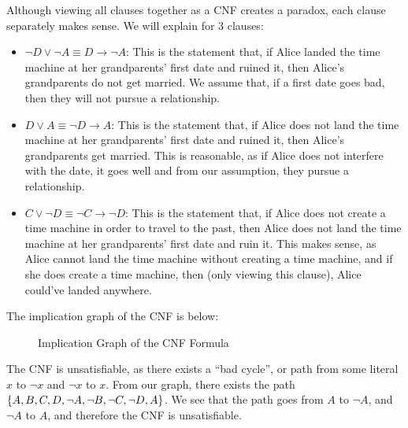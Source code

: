 \documentclass[11pt]{scrartcl}
\theoremstyle{dotlessP}
\theoremstyle{dotlessN}
\DeclarePairedDelimiter\set{\{}{\}}
\begin{document}
Although viewing all clauses together as a CNF creates a paradox, each clause separately makes sense. We will explain for 3 clauses:
\begin{itemize}
	\item $\neg D \lor \neg A \equiv D \to \neg A$: This is the statement that, if Alice landed the time machine at her grandparents' first date and ruined it, then Alice's grandparents do not get married. We assume that, if a first date goes bad, then they will not pursue a relationship. 
	\item $D \lor A \equiv \neg D \to A$: This is the statement that, if Alice does not land the time machine at her grandparents' first date and ruined it, then Alice's grandparents get married. This is reasonable, as if Alice does not interfere with the date, it goes well and from our assumption, they pursue a relationship.
	\item $C \lor \neg D \equiv \neg C \to \neg D$: This is the statement that, if Alice does not create a time machine in order to travel to the past, then Alice does not land the time machine at her grandparents' first date and ruin it. This makes sense, as Alice cannot land the time machine without creating a time machine, and if she does create a time machine, then (only viewing this clause), Alice could've landed anywhere.
\end{itemize}
The implication graph of the CNF is below:
\begin{figure}[H]
	\centering
	\caption{Implication Graph of the CNF Formula}
\end{figure}
The CNF is unsatisfiable, as there exists a ``bad cycle'', or path from some literal $x$ to $\neg x$ and $\neg x$ to $x$. From our graph, there exists the path $\set*{A, B, C, D, \neg A, \neg B, \neg C, \neg D, A}$. We see that the path goes from $A$ to $\neg A$, and $\neg A$ to $A$, and therefore the CNF is unsatisfiable.
\end{document}
